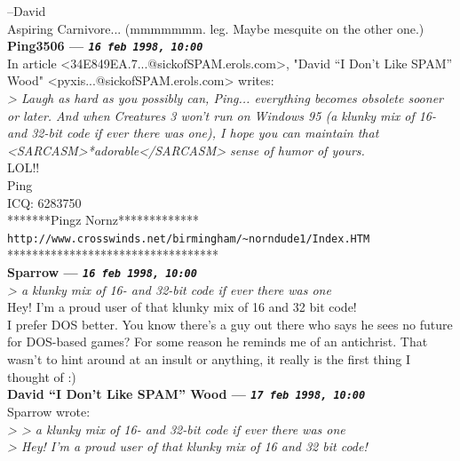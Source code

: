 \documentclass[11pt,twoside,a4paper]{article}
\begin{document}
\begin{multicols*}{2}
--David~\\
Aspiring Carnivore... (mmmmmmm. leg. Maybe mesquite on the other one.)~\\

 
		
	
		
\textbf{Ping3506 --- \emph{\texttt{16 feb 1998, 10:00}}}~\\

In article <34E849EA.7...@sickofSPAM.erols.com>, "David ``I Don't Like SPAM'' Wood" <pyxis...@sickofSPAM.erols.com> writes:~\\
\emph{> Laugh as hard as you possibly can, Ping... everything becomes obsolete sooner or later. And when Creatures 3 won't run on Windows 95 (a klunky mix of 16- and 32-bit code if ever there was one), I hope you can maintain that <SARCASM>*adorable</SARCASM> sense of humor of yours.}~\\

LOL!!~\\

Ping~\\
ICQ:  6283750~\\
*******Pingz Nornz*************~\\
\texttt{http://www.crosswinds.net/birmingham/\textasciitilde norndude1/Index.HTM}~\\
**********************************~\\

 
		
	
		
\textbf{Sparrow --- \emph{\texttt{16 feb 1998, 10:00}}}~\\

\emph{> a klunky mix of 16- and 32-bit code if ever there was one}~\\

Hey! I'm a proud user of that klunky mix of 16 and 32 bit code!~\\

I prefer DOS better. You know there's a guy out there who says he sees no future for DOS-based games? For some reason he reminds me of an antichrist. That wasn't to hint around at an insult or anything, it really is the first thing I thought of :)~\\
		
	
		
\textbf{David ``I Don't Like SPAM'' Wood --- \emph{\texttt{17 feb 1998, 10:00}}}~\\

Sparrow wrote:~\\
\emph{> > a klunky mix of 16- and 32-bit code if ever there was one}~\\
\emph{> Hey! I'm a proud user of that klunky mix of 16 and 32 bit code!}~\\


\end{multicols*}
\end{document}
